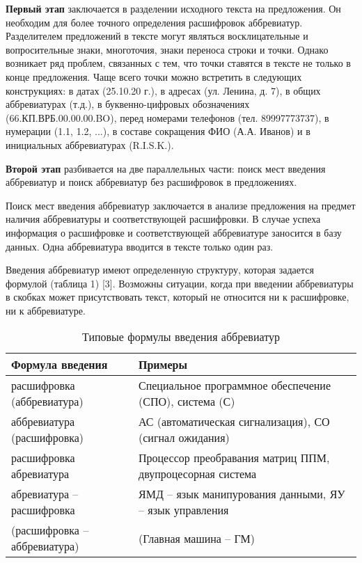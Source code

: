 \documentclass{article}
\begin{document}
\textbf{Первый этап} заключается в разделении исходного текста на предложения. Он необходим для более точного определения расшифровок аббревиатур. Разделителем предложений в тексте могут являться восклицательные и вопросительные знаки, многоточия, знаки переноса строки и точки. Однако возникает ряд проблем, связанных с тем, что точки ставятся в тексте не только в конце предложения. Чаще всего точки можно встретить в следующих конструкциях: в датах (25.10.20 г.), в адресах (ул. Ленина, д. 7), в общих аббревиатурах (т.д.), в буквенно-цифровых обозначениях (66.КП.ВРБ.00.00.00.BO), перед номерами телефонов (тел. 89997773737), в нумерации (1.1, 1.2, ...), в составе сокращения ФИО (А.А. Иванов) и в инициальных аббревиатурах (R.I.S.K.).

\textbf{Второй этап} разбивается на две параллельных части: поиск мест введения аббревиатур и поиск аббревиатур без расшифровок в предложениях.

Поиск мест введения аббревиатур заключается в анализе предложения на предмет наличия аббревиатуры и соответствующей расшифровки. В случае успеха информация о расшифровке и соответствующей аббревиатуре заносится в базу данных. Одна аббревиатура вводится в тексте только один раз.

Введения аббревиатур имеют определенную структуру, которая задается формулой (таблица 1) [3]. Возможны ситуации, когда при введении аббревиатуры в скобках может присутствовать текст, который не относится ни к расшифровке, ни к аббревиатуре.
\newpage
\begin{table}[h!]
    \caption{Типовые формулы введения аббревиатур}
    \label{tab:1}
    \centering
    \begin{tabular}{|l|l|}
        \hline
        Формула введения & Примеры \\
        \hline
        расшифровка (аббревиатура) & Специальное программное обеспечение (СПО), система (С) \\
        \hline
        аббревиатура (расшифровка) & АС (автоматическая сигнализация), СО (сигнал ожидания) \\
        \hline
        расшифровка абревиатура & Процессор преобравания матриц ППМ, двупроцесорная система  \\
        \hline
        абревиатура – расшифровка & ЯМД – язык манипурования данными, ЯУ – язык управления \\
        \hline
        (расшифровка – аббревиатура) & (Главная машина – ГМ) \\
        \hline
    \end{tabular}
\end{table}
\end{document}
